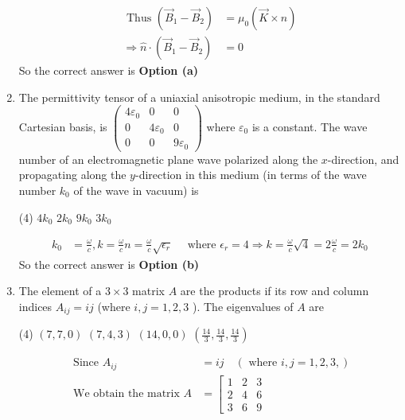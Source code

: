 \begin{enumerate}
\begin{answer}
\begin{align*}
\text { Thus }\left(\vec{B}_{1}-\vec{B}_{2}\right)&=\mu_{0}(\vec{K} \times \hat{n}) \\
\Rightarrow \hat{n} \cdot\left(\vec{B}_{1}-\vec{B}_{2}\right)&=0
	\end{align*}
		So the correct answer is \textbf{Option (a)}
\end{answer}
\item The permittivity tensor of a uniaxial anisotropic medium, in the standard Cartesian basis, is $\left(\begin{array}{ccc}4 \varepsilon_{0} & 0 & 0 \\ 0 & 4 \varepsilon_{0} & 0 \\ 0 & 0 & 9 \varepsilon_{0}\end{array}\right)$ where $\varepsilon_{0}$ is a constant. The wave number of an electromagnetic plane wave polarized along the $x$-direction, and propagating along the $y$-direction in this medium (in terms of the wave number $k_{0}$ of the wave in vacuum) is
 \begin{tasks}(4)
	\task[\textbf{a.}] $4 k_{0}$
	\task[\textbf{b.}]$2 k_{0}$
	\task[\textbf{c.}] $9 k_{0}$
	\task[\textbf{d.}] $3 k_{0}$
\end{tasks}
\begin{answer}
	\begin{align*}
	k_{0}&=\frac{\omega}{c}, k=\frac{\omega}{c} n=\frac{\omega}{c} \sqrt{\epsilon_{r}} \quad\text { where } \epsilon_{r}=4 \Rightarrow k=\frac{\omega}{c} \sqrt{4}=2 \frac{\omega}{c}=2 k_{0}
	\end{align*}
		So the correct answer is \textbf{Option (b)}
\end{answer}
\item  The element of a $3 \times 3$ matrix $A$ are the products if its row and column indices $A_{i j}=i j$ (where $i, j=1,2,3$ ). The eigenvalues of $A$ are
 \begin{tasks}(4)
	\task[\textbf{a.}]$(7,7,0)$
	\task[\textbf{b.}]$(7,4,3)$
	\task[\textbf{c.}]$(14,0,0)$
	\task[\textbf{d.}] $\left(\frac{14}{3}, \frac{14}{3}, \frac{14}{3}\right)$
\end{tasks}
\begin{answer}
	\begin{align*}
\text{	Since }A_{i j }&=i j\quad
	(\text{ where }i, j=1,2,3, )\\
	\text { We obtain the matrix } A&=\left[\begin{array}{lll}
	1 & 2 & 3 \\
	2 & 4 & 6 \\
	3 & 6 & 9

\end{array}
\end{align*}
\end{answer}
\end{enumerate}

